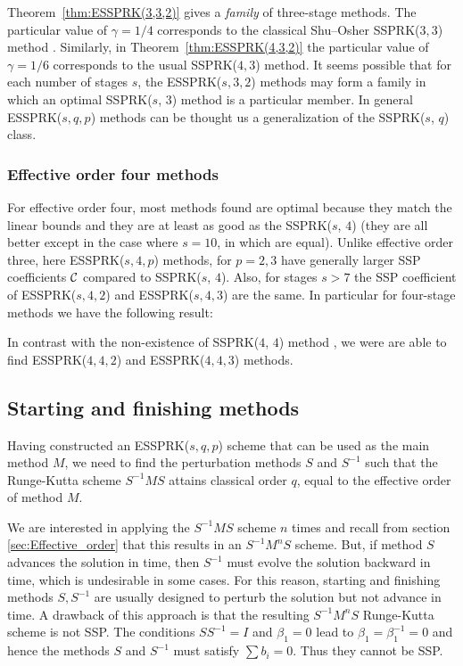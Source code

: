 Theorem~\ref{thm:ESSPRK(3,3,2)} gives a \emph{family} of three-stage methods. 
The particular value of $\gamma = 1/4$ corresponds to the classical Shu--Osher 
SSPRK($3,3$) method \cite{Gottlieb1998}.
Similarly, in Theorem~\ref{thm:ESSPRK(4,3,2)} the particular value of $\gamma = 1/6$ 
corresponds to the usual SSPRK($4,3$) method.
It seems possible that for each number of stages $s$, the ESSPRK($s, 3, 2$) methods may 
form a family in which an optimal SSPRK($s$, $3$) method is a particular member. 
In general ESSPRK($s,q,p$) methods can be thought us a generalization of the SSPRK($s$, $q$) 
class. 

\subsubsection{Effective order four methods}\label{subsubsec:4th_ESSPRK}
For effective order four, most methods found are optimal because they match the linear 
bounds and they are at least as good as the SSPRK($s$, $4$) (they are all better except in the 
case where $s =10$, in which are equal). 
Unlike effective order three, here ESSPRK($s,4,p$) methods, for $p = 2,3$ have generally 
larger SSP coefficients $\mathcal{C}$ compared to SSPRK($s$, $4$). 
Also, for stages $s > 7$ the SSP coefficient of ESSPRK($s,4,2$) and ESSPRK($s,4,3$) are the 
same. 
In particular for four-stage methods we have the following result:
\begin{result}
	In contrast with the non-existence of SSPRK($4$, $4$) method \cite{Gottlieb1998,Ruuth2002}, 
	we were are able to find ESSPRK($4,4,2$) and ESSPRK($4,4,3$) methods.
\end{result}

\subsection{Starting and finishing methods}\label{subsec:starting_finishing}
Having constructed an ESSPRK($s,q,p$) scheme that can be used as the main method $M$, we 
need to find the perturbation methods $S$ and $S^{-1}$ such that the Runge-Kutta scheme 
$S^{-1}MS$ attains classical order $q$, equal to the effective order of method $M$. 

We are interested in applying the $S^{-1}MS$ scheme $n$ times and recall from section 
\ref{sec:Effective_order} that this results in an $S^{-1}M^nS$ scheme. 
But, if method $S$ advances the solution in time, then $S^{-1}$ must evolve the solution 
backward in time, which is undesirable in some cases. 
For this reason, starting and finishing methods $S, S^{-1}$ are usually designed to perturb
the solution but not advance in time. 
A drawback of this approach is that the resulting $S^{-1}M^nS$ Runge-Kutta scheme is not 
SSP. 
The conditions $SS^{-1} = I$ and $\beta_1 = 0$ lead to $\beta_1 = \beta^{-1}_1 = 0$ and 
hence the methods $S$ and $S^{-1}$ must satisfy $\sum b_i = 0$. 
Thus they cannot be SSP.

